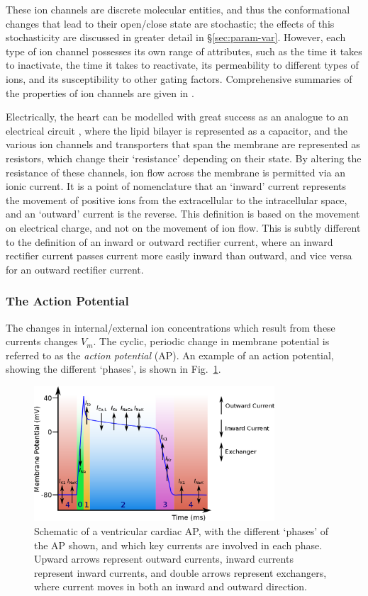 \documentclass[../thesis-main.tex]{subfiles}
\begin{document}
 These ion channels are discrete molecular entities, and thus the conformational changes that lead to their open/close state are stochastic; the effects of this stochasticity are discussed in greater detail in \S\ref{sec:param-var}. However, each type of ion channel possesses its own range of attributes, such as the time it takes to inactivate, the time it takes to reactivate, its permeability to different types of ions, and its susceptibility to other gating factors. Comprehensive summaries of the properties of ion channels are given in \citet{Carmeliet2002, Roden2002}.
 
 Electrically, the heart can be modelled with great success as an analogue to an electrical circuit \citep{Carmeliet2002}, where the lipid bilayer is represented as a capacitor, and the various ion channels and transporters that span the membrane are represented as resistors, which change their `resistance' depending on their state. By altering the resistance of these channels, ion flow across the membrane is permitted via an ionic current. It is a point of nomenclature that an `inward' current represents the movement of positive ions from the extracellular to the intracellular space, and an `outward' current is the reverse. This definition is based on the movement on electrical charge, and not on the movement of ion flow. This is subtly different to the definition of an inward or outward rectifier current, where an inward rectifier current passes current more easily inward than outward, and vice versa for an outward rectifier current.
 
 \subsubsection{The Action Potential}
 \label{subsubsec:ap}
 The changes in internal/external ion concentrations which result from these currents changes $V_m$. The cyclic, periodic change in membrane potential is referred to as the \emph{action potential} (AP). An example of an action potential, showing the different `phases', is shown in Fig.~\ref{fig:ap-structure}. 
 \begin{figure}
  \centering
  \includegraphics[width=0.8\textwidth]{ap-structure-full}
  \caption[Schematic of a cardiac AP]{Schematic of a ventricular cardiac AP, with the different `phases' of the AP shown, and which key currents are involved in each phase. Upward arrows represent outward currents, inward currents represent inward currents, and double arrows represent exchangers, \idest{} where current moves in both an inward and outward direction.}
  \label{fig:ap-structure}
 \end{figure}
 
\end{document}

